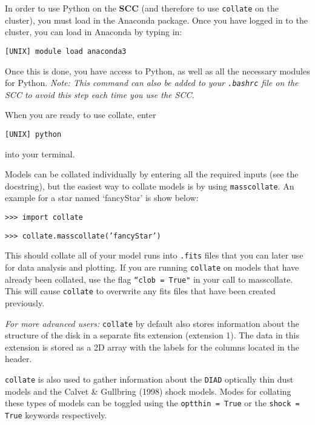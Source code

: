 \documentclass{article}
\begin{document}
\noindent In order to use Python on the \textbf{SCC} (and therefore to use \texttt{collate} on the cluster), you must load in the Anaconda package. Once you have logged in to the cluster, you can load in Anaconda by typing in: 

\vspace{2mm}
\texttt{[UNIX] module load anaconda3}
\vspace{2mm}

\noindent Once this is done, you have access to Python, as well as all the necessary modules for Python. \textit{Note: This command can also be added to your \texttt{.bashrc} file on the SCC to avoid this step each time you use the SCC.}

\vspace{2mm}
\noindent When you are ready to use collate, enter 

\vspace{2mm}
\texttt{[UNIX] python} 
\vspace{2mm}

\noindent into your terminal.

Models can be collated individually by entering all the required inputs (see the docstring), but the easiest way to collate models is by using \texttt{masscollate}. An example for a star named `fancyStar' is show below:

\vspace{2mm}
\texttt{>>> import collate}

\texttt{>>> collate.masscollate('fancyStar')}
\vspace{2mm}

\noindent This should collate all of your model runs into \texttt{.fits} files that you can later use for data analysis and plotting. If you are running \texttt{collate} on models that have already been collated, use the flag \texttt{``clob = True"} in your call to masscollate. This will cause \texttt{collate} to overwrite any fits files that have been created previously.

\textit{For more advanced users:} \texttt{collate} by default also stores information about the structure of the disk in a separate fits extension (extension 1). The data in this extension is stored as a 2D array with the labels for the columns located in the header. 

\texttt{collate} is also used to gather information about the \texttt{DIAD} optically thin dust models and the Calvet \& Gullbring (1998) shock models. Modes for collating these types of models can be toggled using the \texttt{optthin = True} or the \texttt{shock = True} keywords respectively.
\end{document}

